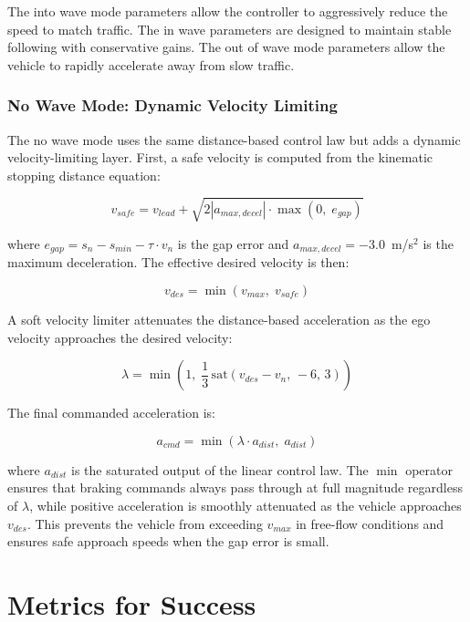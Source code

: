 \documentclass[conference]{IEEEtran}
\begin{document}
The into wave mode parameters allow the controller to aggressively reduce the speed to match traffic. The in wave parameters are designed to maintain stable following with conservative gains. The out of wave mode parameters allow the vehicle to rapidly accelerate away from slow traffic.

\subsubsection{No Wave Mode: Dynamic Velocity Limiting}

The no wave mode uses the same distance-based control law but adds a dynamic velocity-limiting layer. First, a safe velocity is computed from the kinematic stopping distance equation:

\begin{equation}
    v_{safe} = v_{lead} + \sqrt{2 \left| a_{max,decel} \right| \cdot \max(0,\; e_{gap})}
\end{equation}

where $e_{gap} = s_n - s_{min} - \tau \cdot v_n$ is the gap error and $a_{max,decel} = -3.0$~m/s$^2$ is the maximum deceleration. The effective desired velocity is then:

\begin{equation}
    v_{des} = \min(v_{max},\; v_{safe})
\end{equation}

A soft velocity limiter attenuates the distance-based acceleration as the ego velocity approaches the desired velocity:

\begin{equation}
    \lambda = \min\!\left(1,\; \frac{1}{3}\,\text{sat}(v_{des} - v_n,\, -6,\, 3)\right)
\end{equation}

The final commanded acceleration is:

\begin{equation}
    a_{cmd} = \min(\lambda \cdot a_{dist},\; a_{dist})
\end{equation}

where $a_{dist}$ is the saturated output of the linear control law. The $\min$ operator ensures that braking commands always pass through at full magnitude regardless of $\lambda$, while positive acceleration is smoothly attenuated as the vehicle approaches $v_{des}$. This prevents the vehicle from exceeding $v_{max}$ in free-flow conditions and ensures safe approach speeds when the gap error is small.

\section{Metrics for Success}
\end{document}
